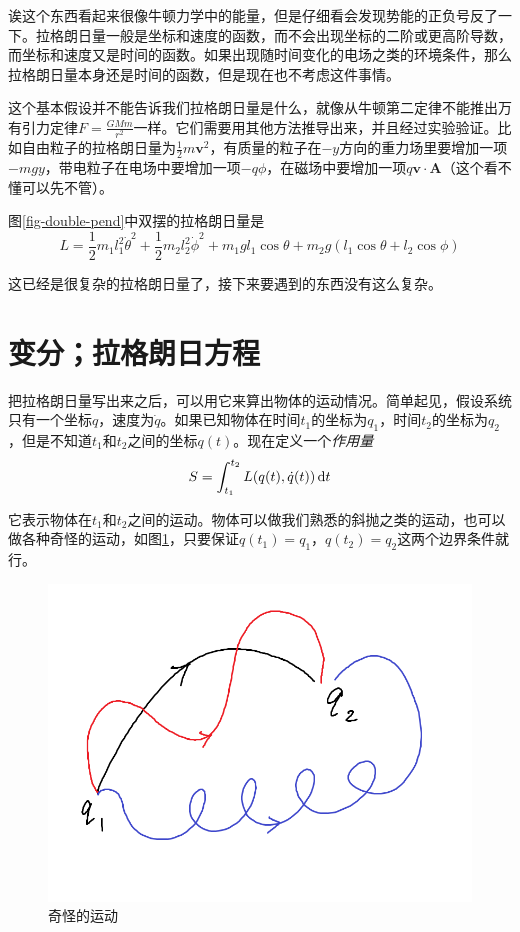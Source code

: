 诶这个东西看起来很像牛顿力学中的能量，但是仔细看会发现势能的正负号反了一下。拉格朗日量一般是坐标和速度的函数，而不会出现坐标的二阶或更高阶导数，而坐标和速度又是时间的函数。如果出现随时间变化的电场之类的环境条件，那么拉格朗日量本身还是时间的函数，但是现在也不考虑这件事情。

这个基本假设并不能告诉我们拉格朗日量是什么，就像从牛顿第二定律不能推出万有引力定律$F=\frac{G M m}{r^2}$一样。它们需要用其他方法推导出来，并且经过实验验证。比如自由粒子的拉格朗日量为$\frac{1}{2}m \mathbf{v}^2$，有质量的粒子在$-y$方向的重力场里要增加一项$-m g y$，带电粒子在电场中要增加一项$-q \phi$，在磁场中要增加一项$q \mathbf{v} \cdot \mathbf{A}$（这个看不懂可以先不管）。

图\ref{fig-double-pend}中双摆的拉格朗日量是
\begin{equation*}
L=\frac{1}{2}m_1 l_1^2 \dot \theta^2+\frac{1}{2}m_2 l_2^2 \dot \phi^2+m_1 g l_1 \cos \theta+m_2 g (l_1 \cos \theta+l_2 \cos \phi)
\end{equation*}

这已经是很复杂的拉格朗日量了，接下来要遇到的东西没有这么复杂。
\section{变分；拉格朗日方程}
把拉格朗日量写出来之后，可以用它来算出物体的运动情况。简单起见，假设系统只有一个坐标$q$，速度为$\dot q$。如果已知物体在时间$t_1$的坐标为$q_1$，时间$t_2$的坐标为$q_2$，但是不知道$t_1$和$t_2$之间的坐标$q(t)$。现在定义一个\emph{作用量}
\begin{equation*}
S=\int_{t_1}^{t_2} L(q(t),\dot q(t)) \mathop{}\!\mathrm{d} t
\end{equation*}

它表示物体在$t_1$和$t_2$之间的运动。物体可以做我们熟悉的斜抛之类的运动，也可以做各种奇怪的运动，如图\ref{fig-strange-move}，只要保证$q(t_1)=q_1$，$q(t_2)=q_2$这两个边界条件就行。
\begin{figure}[htb]
\centering
\includegraphics[scale=0.5]{fig/strange-move}
\caption{奇怪的运动}
\label{fig-strange-move}
\end{figure}

